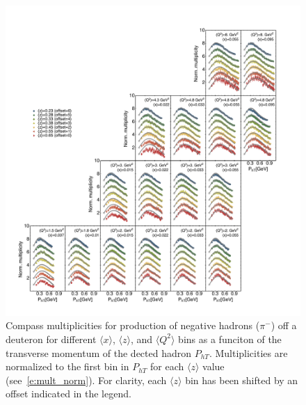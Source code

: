 \documentclass[aps,preprintnumbers,showpacs,nofootinbib,superscriptaddress,floatfix]{revtex4}
\begin{document}
\begin{figure}[h!]
\begin{center}
\includegraphics[width=\textwidth]{plots/COMPASS_SCIplot_flINDEP_Piminus.pdf}
\end{center}
\caption{Compass multiplicities for production of negative hadrons ($\pi^-$) off a deuteron for different $\langle x \rangle$, $\langle z \rangle$, and $\langle Q^2 \rangle$ bins as a funciton of the transverse momentum of the dected hadron  $P_{hT}$. Multiplicities are normalized to the first bin in $P_{hT}$ for each $\langle z \rangle$ value (see~\eqref{e:mult_norm}). For clarity, each $\langle z \rangle$  bin has been shifted by an offset indicated in the legend.} 
\label{f:C_pim}
\end{figure}
\end{document}

